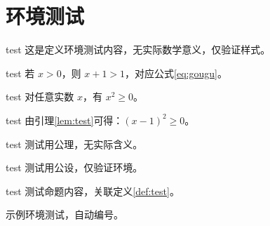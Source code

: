 \section{环境测试}

\ifdefined\simpleTest
\begin{definition}[测试定义]\label{def:test}
\else
\begin{definition}[测试定义]{test}
\fi
这是定义环境测试内容，无实际数学意义，仅验证样式。
\end{definition}

\ifdefined\simpleTest
\begin{theorem}[测试定理]\label{thm:test}
\else
\begin{theorem}[测试定理]{test}
\fi
若 $x>0$，则 $x+1>1$，对应公式\eqref{eq:gougu}。
\end{theorem}

\ifdefined\simpleTest
\begin{lemma}[测试引理]\label{lem:test}
\else
\begin{lemma}[测试引理]{test}
\fi
对任意实数 $x$，有 $x^2\geq0$。
\end{lemma}

\ifdefined\simpleTest
\begin{corollary}[测试推论]\label{cor:test}
\else
\begin{corollary}[测试推论]{test}
\fi
由引理\ref{lem:test}可得：$(x-1)^2\geq0$。
\end{corollary}

\ifdefined\simpleTest
\begin{axiom}[测试公理]\label{axi:test}
\else
\begin{axiom}[测试公理]{test}
\fi
测试用公理，无实际含义。
\end{axiom}

\ifdefined\simpleTest
\begin{postulate}[测试公设]\label{pos:test}
\else
\begin{postulate}[测试公设]{test}
\fi
测试用公设，仅验证环境。
\end{postulate}

\ifdefined\simpleTest
\begin{proposition}[测试命题]\label{pro:test}
\else
\begin{proposition}[测试命题]{test}
\fi
测试命题内容，关联定义\ref{def:test}。
\end{proposition}

\begin{example}\label{exa:test}
示例环境测试，自动编号。
\end{example}


\end{proposition}
\end{postulate}
\end{axiom}
\end{corollary}
\end{lemma}
\end{theorem}
\end{definition}
